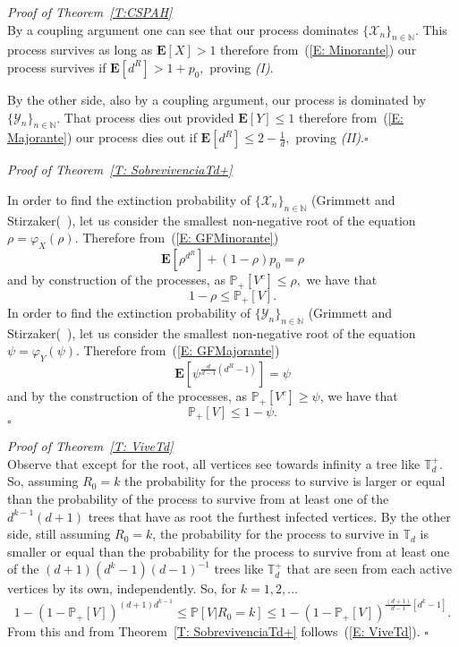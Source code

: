 \documentclass[12pt,reqno,oneside]{amsart}
\theoremstyle{plain}
\theoremstyle{definition}
\numberwithin{equation}{section}
\begin{document}
\noindent 
\textit{Proof of Theorem~\ref{T:CSPAH}}\\
By a coupling argument one can see that our process dominates
$\{\mathcal{X}_n\}_{n \in {{\mathbb N}}}$. This process survives as long as
${{\mathbf E}}[X]> 1$ therefore from~(\ref{E: Minorante}) our process survives
if ${{\mathbf E}}[d^R] > 1 + p_0,$ proving \textit{(I)}. 

By the other side, also by a coupling argument, our process is do\-mi\-na\-ted by
$\{\mathcal{Y}_n\}_{n \in {{\mathbb N}}}.$ That process dies out provided ${{\mathbf E}}[Y] \leq 1$
therefore from~(\ref{E: Majorante}) our process dies out if 
${{\mathbf E}}[d^R] \leq 2 - \frac{1}{d},$ proving \textit{(II)}.{\hfill $\square$}

\noindent 
\textit{Proof of Theorem~\ref{T: SobrevivenciaTd+}}

In order to find the extinction probability of $\{\mathcal{X}_n\}_{n \in {{\mathbb N}}}$ 
(Grimmett and Stirzaker(~\cite[p.173]{GrimmettStirzaker}),
let us consider the smallest non-negative root of the equation $\rho = \varphi_{X}(\rho).$
Therefore from~(\ref{E: GFMinorante})
\[ {{\mathbf E}}[\rho^{d^R}] + (1-\rho)p_0 = \rho \]
and by construction of the processes, as $ {{\mathbb P}}_+[V^c] \leq \rho, $ we have that 
\[ 1- \rho \leq {{\mathbb P}}_+[V] .\]
In order to find the extinction probability of $\{\mathcal{Y}_n\}_{n \in {{\mathbb N}}}$ 
(Grimmett and Stirzaker(~\cite[p.173]{GrimmettStirzaker}), 
let us consider the smallest non-negative root of the equation $\psi = \varphi_{Y}(\psi).$
Therefore from~(\ref{E: GFMajorante})
\[ {{\mathbf E}}[\psi^{\frac{d}{d-1}(d^{R}-1)}] = \psi \]
and by the construction of the processes, as $ {{\mathbb P}}_+[V^c] \geq \psi$, we have that 
\[ {{\mathbb P}}_+[V] \leq 1 - \psi.\]
{\hfill $\square$}

\noindent 
\textit{Proof of Theorem~\ref{T: ViveTd}}\\
Observe that except for the root, all vertices see towards 
infinity a tree like ${{\mathbb T}}_d^+.$ So, assuming $R_0=k$ the probability
for the process to survive is larger or equal than the probability of the
process to survive from at least one of the $d^{k-1}(d+1)$ trees that have
as root the furthest infected vertices. By the other side, still assuming
$R_0=k$, the probability for the process to survive in ${{\mathbb T}}_d$  is smaller
or equal than the probability for the process to survive from at least one 
of the $(d+1)(d^k-1)(d-1)^{-1}$ trees like ${{\mathbb T}}_d^+$ that are seen from 
each active vertices by its own, independently. So, for $k = 1,2,\dots$ 
\[
1 - (1 - {{\mathbb P}}_+[V])^{(d+1)d^{k-1}} \leq {{\mathbb P}}[V | R_0 =k] \leq 
1 - (1 - {{\mathbb P}}_+[V])^{\frac{(d+1)}{d-1}[d^{k}-1]}.
\]
From this and from Theorem~\ref{T: SobrevivenciaTd+} follows~(\ref{E: ViveTd}).
{\hfill $\square$}
\end{document}
